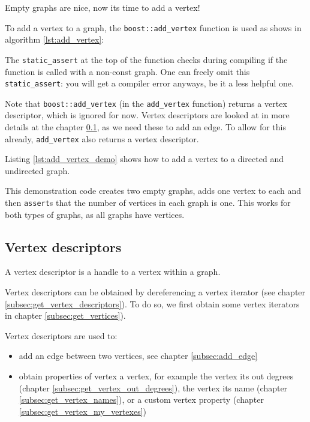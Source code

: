 Empty graphs are nice, now its time to add a vertex!

To add a vertex to a graph, 
the \verb;boost::add_vertex; 
function is used as shows in algorithm \ref{lst:add_vertex}:



The \verb;static_assert; 
at the top of the function checks during compiling if the function is called
with a non-const graph.
One can freely omit this \verb;static_assert;: you will get a compiler error anyways,
be it a less helpful one.

Note that \verb;boost::add_vertex; (in the \verb;add_vertex; function) 
returns a vertex
descriptor, which is ignored for now.
Vertex descriptors are looked at in more details 
at the chapter \ref{subsec:Vertex-descriptors}, 
as we need these to add an edge.
To allow for this already, \verb;add_vertex; also returns a vertex descriptor.

Listing \ref{lst:add_vertex_demo}
shows how to add a vertex to a directed and undirected graph.



This demonstration code creates two empty graphs, adds one vertex to each
and then \verb;assert;s that the number of vertices in each graph is one.
This works for both types of graphs, as all graphs have vertices.

\subsection{Vertex descriptors}
\label{subsec:Vertex-descriptors}

A vertex descriptor is a handle to a vertex within a graph.

Vertex descriptors can be obtained by dereferencing a vertex iterator (see
chapter \ref{subsec:get_vertex_descriptors}).
To do so, we first obtain some vertex iterators in chapter 
\ref{subsec:get_vertices}).
 
Vertex descriptors are used to:

\begin{itemize}
  \item add an edge between two vertices, see chapter \ref{subsec:add_edge}
  \item obtain properties of vertex a vertex, 
    for example the vertex its out degrees (chapter \ref{subsec:get_vertex_out_degrees}), 
    the vertex its name (chapter \ref{subsec:get_vertex_names}), 
    or a custom vertex property (chapter \ref{subsec:get_vertex_my_vertexes})
\end{itemize}

